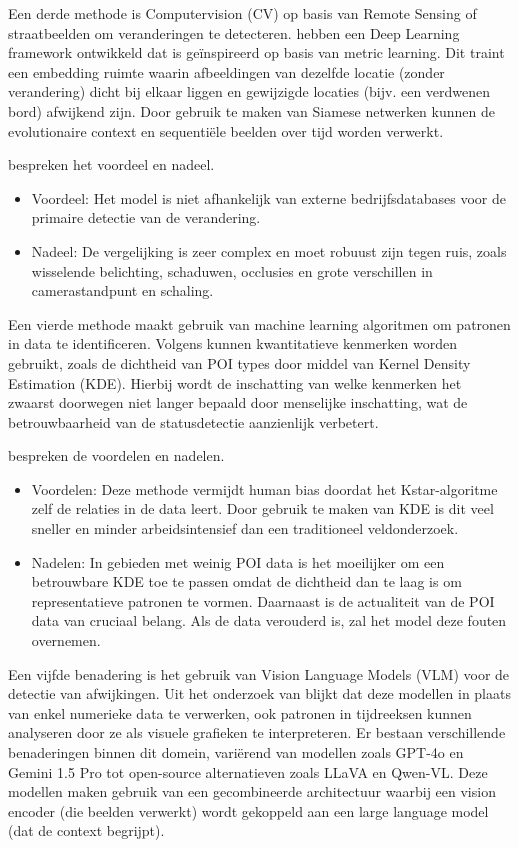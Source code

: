 Een derde methode is Computervision (CV) op basis van Remote Sensing of straatbeelden om veranderingen te detecteren. \textcite{Revaud2019} hebben een Deep Learning framework ontwikkeld dat is geïnspireerd op basis van metric learning. Dit traint een embedding ruimte waarin afbeeldingen van dezelfde locatie (zonder verandering) dicht bij elkaar liggen en gewijzigde locaties (bijv. een verdwenen bord) afwijkend zijn. Door gebruik te maken van Siamese netwerken kunnen de evolutionaire context en sequentiële beelden over tijd worden verwerkt.

\textcite{Revaud2019} bespreken het voordeel en nadeel. 
\begin{itemize}   
    \item Voordeel: Het model is niet afhankelijk van externe bedrijfsdatabases voor de primaire detectie van de verandering.   
    \item Nadeel: De vergelijking is zeer complex en moet robuust zijn tegen ruis, zoals wisselende belichting, schaduwen, occlusies en grote verschillen in camerastandpunt en schaling. 
\end{itemize}

Een vierde methode maakt gebruik van machine learning algoritmen om patronen in data te identificeren. Volgens \textcite{Luo2023} kunnen kwantitatieve kenmerken worden gebruikt, zoals de dichtheid van POI types door middel van Kernel Density Estimation (KDE). Hierbij wordt de inschatting van welke kenmerken het zwaarst doorwegen niet langer bepaald door menselijke inschatting, wat de betrouwbaarheid van de statusdetectie aanzienlijk verbetert.

\textcite{Luo2023} bespreken de voordelen en nadelen. 
\begin{itemize}   
    \item Voordelen: Deze methode vermijdt human bias doordat het Kstar-algoritme zelf de relaties in de data leert. Door gebruik te maken van KDE is dit veel sneller en minder arbeidsintensief dan een traditioneel veldonderzoek.
    \item Nadelen: In gebieden met weinig POI data is het moeilijker om een betrouwbare KDE toe te passen omdat de dichtheid dan te laag is om representatieve patronen te vormen. Daarnaast is de actualiteit van de POI data van cruciaal belang. Als de data verouderd is, zal het model deze fouten overnemen.
\end{itemize}

Een vijfde benadering is het gebruik van Vision Language Models (VLM) voor de detectie van afwijkingen. Uit het onderzoek van \textcite{He2025} blijkt dat deze modellen in plaats van enkel numerieke data te verwerken, ook patronen in tijdreeksen kunnen analyseren door ze als visuele grafieken te interpreteren. Er bestaan verschillende benaderingen binnen dit domein, variërend van modellen zoals GPT-4o en Gemini 1.5 Pro tot open-source alternatieven zoals LLaVA en Qwen-VL. Deze modellen maken gebruik van een gecombineerde architectuur waarbij een vision encoder (die beelden verwerkt) wordt gekoppeld aan een large language model (dat de context begrijpt).

